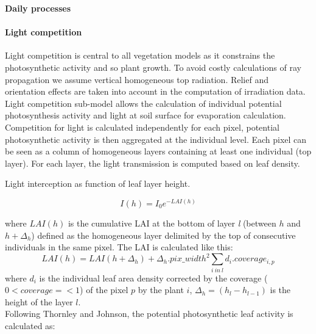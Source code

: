 \textbf{Daily processes}

\paragraph{Light competition}Light competition is central to all vegetation models as it constrains the photosynthetic activity and so plant growth. To avoid costly calculations of ray propagation we assume vertical homogeneous top radiation. Relief and orientation effects are taken into account in the computation of irradiation data.\\
Light competition sub-model allows the calculation of individual potential photosynthesis activity and light at soil surface for evaporation calculation.\\
Competition for light is calculated independently for each pixel, potential photosynthetic activity is then aggregated at the individual level. Each pixel can be seen as a column of homogeneous layers containing at least one individual (top layer). For each layer, the light transmission is computed based on leaf density.


\begin{marginfigure}
\label{fig:derivaives}
\caption{Light interception as function of leaf layer height.}
\end{marginfigure}

\begin{equation}\label{eq:Ih}
I(h) =  I_{0} e^{-LAI(h)}
\end{equation}

where $LAI(h)$ is the cumulative LAI at the bottom of layer \textit{l} (between $h$ and $h+\Delta_{h}$) defined as the homogeneous layer delimited by the top of consecutive individuals in the same pixel. The LAI is calculated like this:
\begin{equation}\label{eq:LAI}
LAI(h) = LAI(h+\Delta_{h}) +   \Delta_{h} . pix\_width^{2} \sum_{i\ in\ l}d_{i}.coverage_{i, p}
\end{equation}
where $d_{i}$ is the individual leaf area density corrected by the coverage ($0< coverage =< 1$) of the pixel $p$ by the plant $i$, $\Delta_{h} = (h_{l} - h_{l-1})$ is the height of the layer $l$.\\
Following Thornley and Johnson, the potential photosynthetic leaf activity is calculated as:


